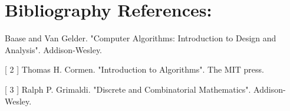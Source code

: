 \section{Bibliography References:}

\begin{flushleft}
[ 1 ] Baase and Van Gelder. "Computer Algorithms: Introduction to Design and Analysis". Addison-Wesley. \hfill \break

[ 2 ] Thomas H. Cormen. "Introduction to Algorithms". The MIT press. \hfill \break

[ 3 ] Ralph P. Grimaldi. "Discrete and Combinatorial Mathematics". Addison-Wesley.
\end{flushleft}